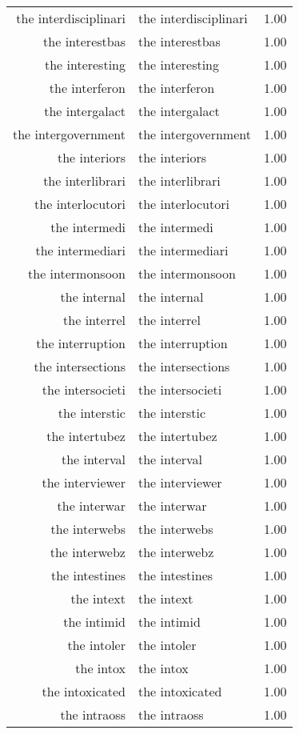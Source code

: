 \begin{table}[ht]
\begin{tabular}{rlr}
  the interdisciplinari & the interdisciplinari & 1.00 \\ 
  the interestbas & the interestbas & 1.00 \\ 
  the interesting & the interesting & 1.00 \\ 
  the interferon & the interferon & 1.00 \\ 
  the intergalact & the intergalact & 1.00 \\ 
  the intergovernment & the intergovernment & 1.00 \\ 
  the interiors & the interiors & 1.00 \\ 
  the interlibrari & the interlibrari & 1.00 \\ 
  the interlocutori & the interlocutori & 1.00 \\ 
  the intermedi & the intermedi & 1.00 \\ 
  the intermediari & the intermediari & 1.00 \\ 
  the intermonsoon & the intermonsoon & 1.00 \\ 
  the internal & the internal & 1.00 \\ 
  the interrel & the interrel & 1.00 \\ 
  the interruption & the interruption & 1.00 \\ 
  the intersections & the intersections & 1.00 \\ 
  the intersocieti & the intersocieti & 1.00 \\ 
  the interstic & the interstic & 1.00 \\ 
  the intertubez & the intertubez & 1.00 \\ 
  the interval & the interval & 1.00 \\ 
  the interviewer & the interviewer & 1.00 \\ 
  the interwar & the interwar & 1.00 \\ 
  the interwebs & the interwebs & 1.00 \\ 
  the interwebz & the interwebz & 1.00 \\ 
  the intestines & the intestines & 1.00 \\ 
  the intext & the intext & 1.00 \\ 
  the intimid & the intimid & 1.00 \\ 
  the intoler & the intoler & 1.00 \\ 
  the intox & the intox & 1.00 \\ 
  the intoxicated & the intoxicated & 1.00 \\ 
  the intraoss & the intraoss & 1.00 \\ 

\end{tabular}
\end{table}
